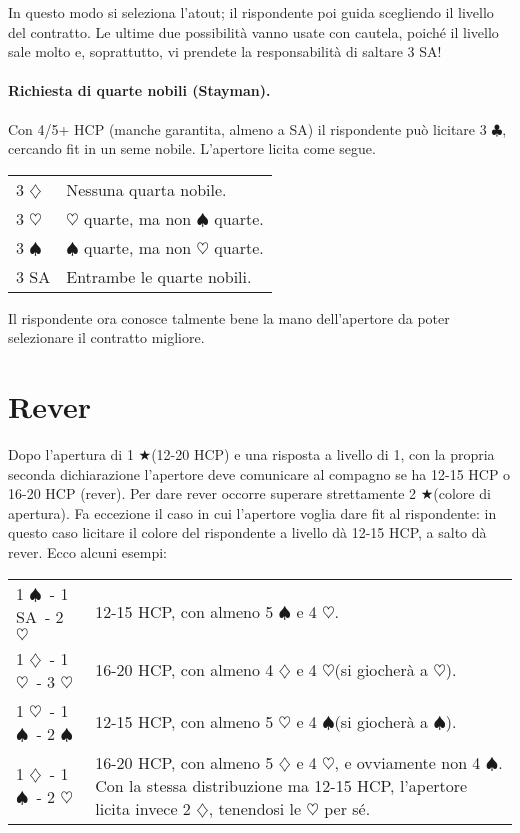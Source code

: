\documentclass[a4paper,10pt]{article}
\renewcommand{\c}{$\clubsuit$\xspace}
\renewcommand{\d}{$\diamondsuit$\xspace}
\newcommand{\h}{$\heartsuit$\xspace}
\newcommand{\s}{$\spadesuit$\xspace}
\renewcommand{\j}{$\bigstar$\xspace}
\newcommand{\sa}{SA\xspace}
\newcommand{\smallspace}{\vskip0.3cm}
\newenvironment{twocol}
  {\smallspace\noindent\begin{tabular}{l p{0.78\textwidth}}}
  {\end{tabular}\smallspace}
\begin{document}
In questo modo si seleziona l'atout; il rispondente poi guida scegliendo il livello del contratto. Le ultime due possibilità vanno usate con cautela, poiché il livello sale molto e, soprattutto, vi prendete la responsabilità di saltare 3 \sa!

\paragraph{Richiesta di quarte nobili (Stayman).} Con 4/5+ HCP (manche garantita, almeno a \sa) il rispondente può licitare 3 \c, cercando fit in un seme nobile. L'apertore licita come segue.

\begin{twocol}
 3 \d & Nessuna quarta nobile.\\
 3 \h & \h quarte, ma non \s quarte.\\
 3 \s & \s quarte, ma non \h quarte.\\
 3 SA & Entrambe le quarte nobili.
\end{twocol}

Il rispondente ora conosce talmente bene la mano dell'apertore da poter selezionare il contratto migliore.

\section{Rever}

Dopo l'apertura di 1 \j (12-20 HCP) e una risposta a livello di 1, con la propria seconda dichiarazione l'apertore deve comunicare al compagno se ha 12-15 HCP o 16-20 HCP (rever). Per dare rever occorre superare strettamente 2 \j (colore di apertura). Fa eccezione il caso in cui l'apertore voglia dare fit al rispondente: in questo caso licitare il colore del rispondente a livello dà 12-15 HCP, a salto dà rever. Ecco alcuni esempi:

\begin{twocol}
1 \s\ - 1 \sa\ - 2 \h & 12-15 HCP, con almeno 5 \s e 4 \h.\\
1 \d\ - 1 \h\ - 3 \h & 16-20 HCP, con almeno 4 \d e 4 \h (si giocherà a \h).\\
1 \h\ - 1 \s\ - 2 \s & 12-15 HCP, con almeno 5 \h e 4 \s (si giocherà a \s).\\
1 \d\ - 1 \s\ - 2 \h & 16-20 HCP, con almeno 5 \d e 4 \h, e ovviamente non 4 \s. Con la stessa distribuzione ma 12-15 HCP, l'apertore licita invece 2 \d, tenendosi le \h per sé.
\end{twocol}
\end{document}
